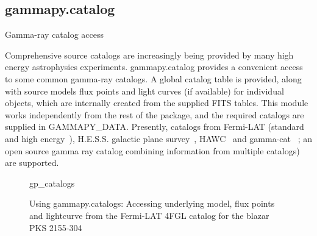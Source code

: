 \subsection{gammapy.catalog}
\label{ssec:gammapy-catalog}
Gamma-ray catalog access

Comprehensive source catalogs are increasingly being provided by many high
energy astrophysics experiments. gammapy.catalog provides a convenient access
to some common gamma-ray catalogs. A global catalog table is provided, along
with source models flux points and light curves (if available) for individual
objects, which are internally created from the supplied FITS tables. This
module works independently from the rest of the package, and the required
catalogs are supplied in GAMMAPY\_DATA. Presently, catalogs from Fermi-LAT
(standard~\citep{3FGL, 4FGL} and high energy~\citep{2FHL, 3FHL}), H.E.S.S.
galactic plane survey~\citep{HGPS}, HAWC~\citep{2HWC, 3HWC} and gamma-cat
~\citep{gamma-cat}; an open source gamma ray catalog combining information from
multiple catalogs) are supported.

\begin{figure}
	{gp_catalogs}
	\caption{Using gammapy.catalogs: Accessing underlying model, flux points and
		lightcurve from the Fermi-LAT 4FGL catalog for the blazar PKS 2155-304}
	\label{codeexample:data} \end{figure}
